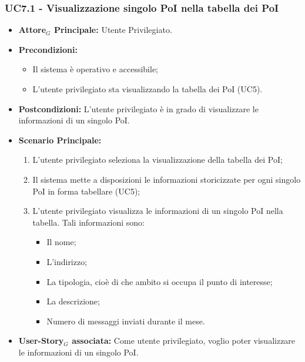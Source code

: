 \documentclass[11pt]{article}
\begin{document}
\begin{justify}
\subsubsection{\textbf{UC7.1 - Visualizzazione singolo PoI nella tabella dei PoI}}
\label{UC7.1}
\begin{itemize}
    \item \textbf{Attore$_G$ Principale:} Utente Privilegiato.
    \item \textbf{Precondizioni:} 
        \begin{itemize}
          \item Il sistema è operativo e accessibile;
            \item L'utente privilegiato sta visualizzando la tabella dei PoI (UC5).
        \end{itemize}
      \item \textbf{Postcondizioni:} L'utente privilegiato è in grado di visualizzare le informazioni di un singolo PoI.\\
    \item \textbf{Scenario Principale:} 
        \begin{enumerate}
        \item L'utente privilegiato seleziona la visualizzazione della tabella dei PoI;
          \item Il sistema mette a disposizioni le informazioni storicizzate per ogni singolo PoI in forma tabellare (UC5);
          \item L'utente privilegiato visualizza le informazioni di un singolo PoI nella tabella. Tali informazioni sono:
        \begin{itemize}
       \item Il nome;
       \item L'indirizzo;
       \item La tipologia, cioè di che ambito si occupa il punto di interesse;
       \item La descrizione;
         \item Numero di messaggi inviati durante il mese.
        \end{itemize}
        \end{enumerate}
    \item \textbf{User-Story$_G$ associata:} Come utente privilegiato, voglio poter visualizzare le informazioni di un singolo PoI.
\end{itemize}


\end{justify}
\end{document}
